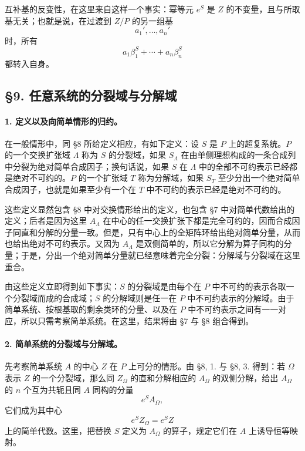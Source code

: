 互补基的反变性，在这里来自这样一个事实：幂等元 \(e^S\) 是 \(Z\) 的不变量，且与所取基无关；也就是说，在过渡到 \(Z/P\) 的另一组基
\[
        a_1',\ldots,a_n'
\]
时，所有
\[
        a_1\beta_1^S+\cdots+a_n\beta_n^S
\]
都转入自身。

\subsection*{§9. 任意系统的分裂域与分解域}

\paragraph{1. 定义以及向简单情形的归约。}
在一般情形中，同 §8 所给定义相应，有如下定义：设 \(S\) 是 \(P\) 上的超复系统。\(P\) 的一个交换扩张域 \(\Lambda\) 称为 \(S\) 的分裂域，如果 \(S_\Lambda\) 在由单侧理想构成的一条合成列中分裂为绝对简单合成因子；换句话说，如果 \(S\) 在 \(\Lambda\) 中的全部不可约表示已经都是绝对不可约的。\(P\) 的一个扩张域 \(T\) 称为分解域，如果 \(S_T\) 至少分出一个绝对简单合成因子，也就是如果至少有一个在 \(T\) 中不可约的表示已经是绝对不可约的。

这些定义显然包含 §8 中对交换情形给出的定义，也包含 §7 中对简单代数给出的定义；后者是因为这里 \(A_\Lambda\) 在中心的任一交换扩张下都是完全可约的，因而合成因子同直和分解的分量一致。但是，只有中心上的全矩阵环给出绝对简单分量，从而也给出绝对不可约表示。又因为 \(A_\Lambda\) 是双侧简单的，所以它分解为算子同构的分量；于是，分出一个绝对简单分量就已经意味着完全分裂：分解域与分裂域在这里重合。

由这些定义立即得到如下事实：\(S\) 的分裂域是由每个在 \(P\) 中不可约的表示各取一个分裂域而成的合成域；\(S\) 的分解域则是任一在 \(P\) 中不可约表示的分解域。由于简单系统、按根基取的剩余类环的分量、以及在 \(P\) 中不可约表示之间有一一对应，所以只需考察简单系统。在这里，结果将由 §7 与 §8 组合得到。

\paragraph{2. 简单系统的分裂域与分解域。}
先考察简单系统 \(A\) 的中心 \(Z\) 在 \(P\) 上可分的情形。由 §8, 1. 与 §8, 3. 得到：若 \(\Omega\) 表示 \(Z\) 的一个分裂域，那么同 \(Z_\Omega\) 的直和分解相应的 \(A_\Omega\) 的双侧分解，给出 \(A_\Omega\) 的 \(n\) 个互为共轭且同 \(A\) 同构的分量
\[
        e^S A_\Omega ,
\]
它们成为其中心
\[
        e^S Z_\Omega=e^S Z
\]
上的简单代数。这里，把替换 \(S\) 定义为 \(A_\Omega\) 的算子，规定它们在 \(A\) 上诱导恒等映射。

